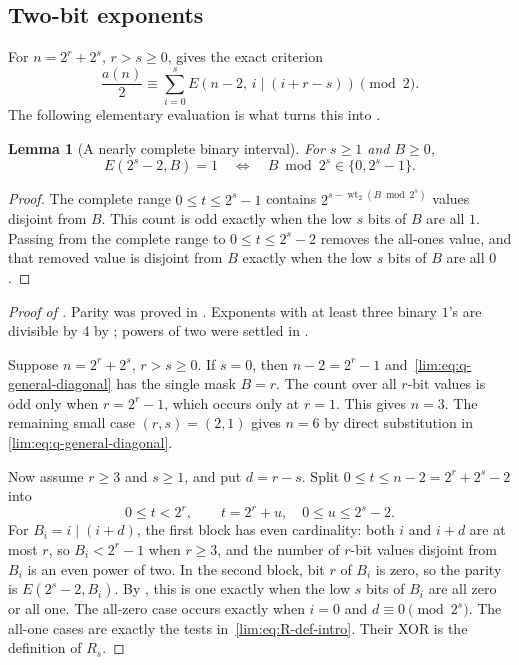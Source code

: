 \documentclass[11pt]{article}
\newtheorem{lemma}[theorem]{Lemma}
\theoremstyle{definition}
\theoremstyle{remark}
\newcommand{\wt}{\operatorname{wt}_2}
\newcommand{\bor}{\mathbin{\vert}}
\begin{document}
\subsection{Two-bit exponents}

For $n=2^r+2^s$, $r>s\ge0$,  gives the exact
criterion
\begin{equation}\label{lim:eq:q-general-diagonal}
 \frac{a(n)}2
 \equiv
 \sum_{i=0}^{s}E(n-2,\,i\bor(i+r-s))
 \pmod2.
\end{equation}
The following elementary evaluation is what turns this into
.

\begin{lemma}[A nearly complete binary interval]
\label{lim:lem:nearly-complete}
For $s\ge1$ and $B\ge0$,
\begin{equation}\label{lim:eq:nearly-complete}
 E(2^s-2,B)=1
 \quad\Longleftrightarrow\quad
 B\bmod2^s\in\{0,2^s-1\}.
\end{equation}
\end{lemma}

\begin{proof}
The complete range $0\le t\le2^s-1$ contains
$2^{s-\wt(B\bmod2^s)}$ values disjoint from $B$.  This count is odd exactly
when the low $s$ bits of $B$ are all $1$.  Passing from the complete range to
$0\le t\le2^s-2$ removes the all-ones value, and that removed value is
disjoint from $B$ exactly when the low $s$ bits of $B$ are all $0$.
\end{proof}

\begin{proof}[Proof of ]
Parity was proved in .  Exponents with at least three
binary $1$'s are divisible by $4$ by ; powers of
two were settled in .

Suppose $n=2^r+2^s$, $r>s\ge0$.  If $s=0$, then
$n-2=2^r-1$ and~\eqref{lim:eq:q-general-diagonal} has the single mask $B=r$.
The count over all $r$-bit values is odd only when $r=2^r-1$, which occurs
only at $r=1$.  This gives $n=3$.
The remaining small case $(r,s)=(2,1)$ gives $n=6$ by direct substitution in
\eqref{lim:eq:q-general-diagonal}.

Now assume $r\ge3$ and $s\ge1$, and put $d=r-s$.  Split
$0\le t\le n-2=2^r+2^s-2$ into
\[
  0\le t<2^r,
  \qquad
  t=2^r+u,\quad0\le u\le2^s-2.
\]
For $B_i=i\bor(i+d)$, the first block has even cardinality: both $i$ and
$i+d$ are at most $r$, so $B_i<2^r-1$ when $r\ge3$, and the number of
$r$-bit values disjoint from $B_i$ is an even power of two.  In the second
block, bit $r$ of $B_i$ is zero, so the parity is
$E(2^s-2,B_i)$.  By , this is one exactly when the
low $s$ bits of $B_i$ are all zero or all one.  The all-zero case occurs
exactly when $i=0$ and $d\equiv0\pmod{2^s}$.  The all-one cases are exactly
the tests in~\eqref{lim:eq:R-def-intro}.  Their XOR is the definition of $R_s$.
\end{proof}
\end{document}
